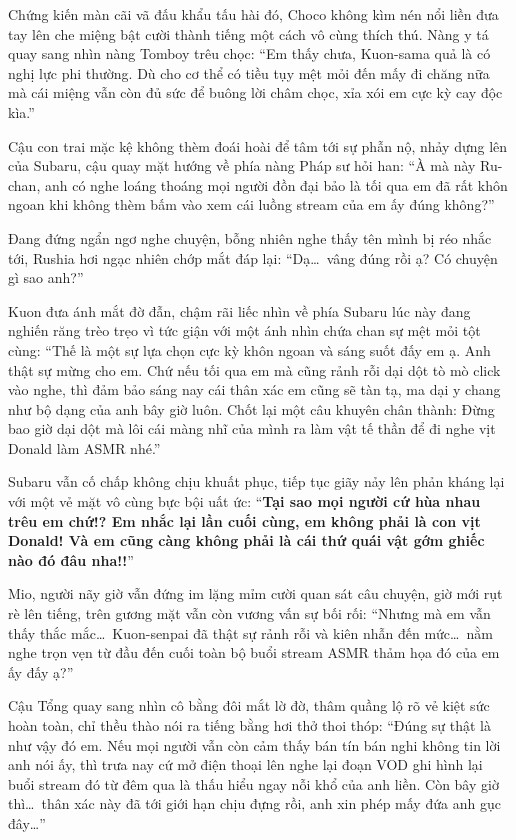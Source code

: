 \documentclass[../main.tex]{subfiles}
\begin{document}
Chứng kiến màn cãi vã đấu khẩu tấu hài đó, Choco không kìm nén nổi liền đưa tay lên che miệng bật cười thành tiếng một cách vô cùng thích thú. Nàng y tá quay sang nhìn nàng Tomboy trêu chọc: ``Em thấy chưa, Kuon-sama quả là có nghị lực phi thường. Dù cho cơ thể có tiều tụy mệt mỏi đến mấy đi chăng nữa mà cái miệng vẫn còn đủ sức để buông lời châm chọc, xỉa xói em cực kỳ cay độc kìa.''

Cậu con trai mặc kệ không thèm đoái hoài để tâm tới sự phẫn nộ, nhảy dựng lên của Subaru, cậu quay mặt hướng về phía nàng Pháp sư hỏi han: ``À mà này Ru-chan, anh có nghe loáng thoáng mọi người đồn đại bảo là tối qua em đã rất khôn ngoan khi không thèm bấm vào xem cái luồng stream của em ấy đúng không?''

Đang đứng ngẩn ngơ nghe chuyện, bỗng nhiên nghe thấy tên mình bị réo nhắc tới, Rushia hơi ngạc nhiên chớp mắt đáp lại: ``Dạ\dots\ vâng đúng rồi ạ? Có chuyện gì sao anh?''

Kuon đưa ánh mắt đờ đẫn, chậm rãi liếc nhìn về phía Subaru lúc này đang nghiến răng trèo trẹo vì tức giận với một ánh nhìn chứa chan sự mệt mỏi tột cùng: ``Thế là một sự lựa chọn cực kỳ khôn ngoan và sáng suốt đấy em ạ. Anh thật sự mừng cho em. Chứ nếu tối qua em mà cũng rảnh rỗi dại dột tò mò click vào nghe, thì đảm bảo sáng nay cái thân xác em cũng sẽ tàn tạ, ma dại y chang như bộ dạng của anh bây giờ luôn. Chốt lại một câu khuyên chân thành: Đừng bao giờ dại dột mà lôi cái màng nhĩ của mình ra làm vật tế thần để đi nghe vịt Donald làm ASMR nhé.''

Subaru vẫn cố chấp không chịu khuất phục, tiếp tục giãy nảy lên phản kháng lại với một vẻ mặt vô cùng bực bội uất ức: ``\textbf{Tại sao mọi người cứ hùa nhau trêu em chứ!? Em nhắc lại lần cuối cùng, em không phải là con vịt Donald! Và em cũng càng không phải là cái thứ quái vật gớm ghiếc nào đó đâu nha!!}''

Mio, người nãy giờ vẫn đứng im lặng mỉm cười quan sát câu chuyện, giờ mới rụt rè lên tiếng, trên gương mặt vẫn còn vương vấn sự bối rối: ``Nhưng mà em vẫn thấy thắc mắc\dots\ Kuon-senpai đã thật sự rảnh rỗi và kiên nhẫn đến mức\dots\ nằm nghe trọn vẹn từ đầu đến cuối toàn bộ buổi stream ASMR thảm họa đó của em ấy đấy ạ?''

Cậu Tổng quay sang nhìn cô bằng đôi mắt lờ đờ, thâm quầng lộ rõ vẻ kiệt sức hoàn toàn, chỉ thều thào nói ra tiếng bằng hơi thở thoi thóp: ``Đúng sự thật là như vậy đó em. Nếu mọi người vẫn còn cảm thấy bán tín bán nghi không tin lời anh nói ấy, thì trưa nay cứ mở điện thoại lên nghe lại đoạn VOD ghi hình lại buổi stream đó từ đêm qua là thấu hiểu ngay nỗi khổ của anh liền. Còn bây giờ thì\dots\ thân xác này đã tới giới hạn chịu đựng rồi, anh xin phép mấy đứa anh gục đây\dots''
\end{document}
